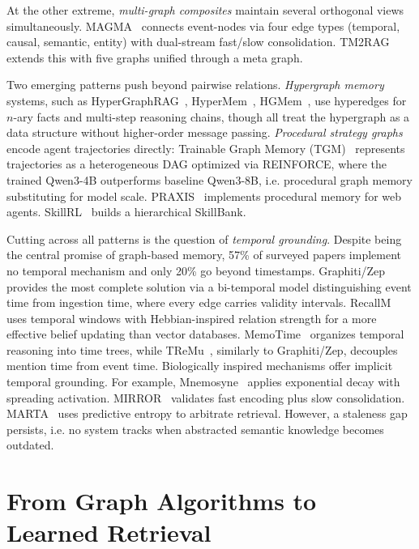 \documentclass[hf]{ceurart}
\begin{document}
At the other extreme, \emph{multi-graph composites} maintain several
orthogonal views simultaneously. MAGMA~\cite{magma2026} connects event-nodes via four edge types
(temporal, causal, semantic, entity) with dual-stream fast/slow
consolidation. TM2RAG~\cite{tm2rag2026} extends this with five graphs unified
through a meta graph.

Two emerging patterns push beyond pairwise relations.
\emph{Hypergraph memory} systems, such as HyperGraphRAG~\cite{hypergraphrag2025},
HyperMem~\cite{hypermem2026}, HGMem~\cite{hgmem2025}, use hyperedges
for $n$-ary facts and multi-step reasoning chains, though all treat
the hypergraph as a data structure without higher-order message
passing. \emph{Procedural strategy graphs} encode agent trajectories directly:
Trainable Graph Memory (TGM)~\cite{trainablegraph2025} represents
trajectories as a heterogeneous DAG optimized via REINFORCE, where
the trained Qwen3-4B outperforms baseline Qwen3-8B, i.e. procedural graph memory substituting for model scale. PRAXIS~\cite{praxis2026} implements
procedural memory for web agents. SkillRL~\cite{skillrl2026} builds
a hierarchical SkillBank.

Cutting across all patterns is the question of \emph{temporal
grounding}. Despite being the central promise of graph-based memory,
57\% of surveyed papers implement no temporal mechanism and only 20\% go
beyond timestamps. Graphiti/Zep~\cite{rasmussen2025} provides the
most complete solution via a bi-temporal model distinguishing
event time from ingestion time, where every edge
carries validity intervals. RecallM~\cite{recallm2023} uses temporal windows with
Hebbian-inspired relation strength for a more effective belief
updating than vector databases. MemoTime~\cite{memotime2025} organizes temporal reasoning into
time trees, while TReMu~\cite{tremu2025}, similarly to Graphiti/Zep, decouples mention time
from event time. Biologically inspired mechanisms offer implicit temporal grounding. For example,
Mnemosyne~\cite{mnemosyne2025} applies exponential decay with spreading activation. MIRROR~\cite{mirror2026} validates fast
encoding plus slow consolidation. MARTA~\cite{marta2026} uses predictive entropy to arbitrate
retrieval. However, a staleness gap persists, i.e. no system tracks when abstracted
semantic knowledge becomes outdated.

\section{From Graph Algorithms to Learned Retrieval}
\label{sec:retrieval}
\end{document}
